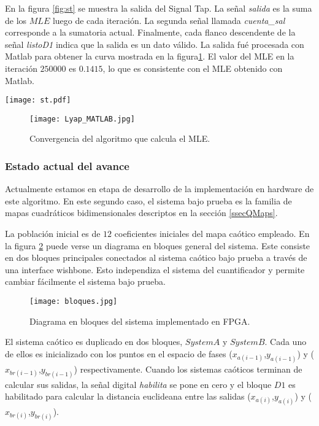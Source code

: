 En la figura \ref{fig:st} se muestra la salida del Signal Tap.
La señal \textit{salida} es la suma de los $MLE$ luego de cada iteración.
La segunda señal llamada \textit{cuenta\_sal} corresponde a la sumatoria actual.
Finalmente, cada flanco descendente de la señal \textit{listoD1} indica que la salida es un dato válido.
La salida fué procesada con Matlab para obtener la curva mostrada en la figura\ref{fig:lyapu}.
El valor del MLE en la iteración $250000$ es $0.1415$, lo que es consistente con el MLE obtenido con Matlab.
%
\begin{figure*}
	\centering
	\texttt{[image: st.pdf]}\\
	\caption{Salida del Signal Tap.}\label{fig:st}
\end{figure*}
%
\begin{figure}
	\centering
	\texttt{[image: Lyap\_MATLAB.jpg]}\\
	\caption{Convergencia del algoritmo que calcula el MLE.}\label{fig:lyapu}
\end{figure}


\subsubsection{Estado actual del avance}

Actualmente estamos en etapa de desarrollo de la implementación en hardware de este algoritmo.
En este segundo caso, el sistema bajo prueba es la familia de mapas cuadráticos bidimensionales descriptos en la sección \ref{ssecQMaps}.

La población inicial es de $12$ coeficientes iniciales del mapa caótico empleado.
En la figura \ref{bloques} puede verse un diagrama en bloques general del sistema.
Este consiste en dos bloques principales conectados al sistema caótico bajo prueba a través de una interface wishbone.
Esto independiza el sistema del cuantificador y permite cambiar fácilmente el sistema bajo prueba.
%
\begin{figure}
	\centering
	\texttt{[image: bloques.jpg]}\\
	\caption{Diagrama en bloques del sistema implementado en FPGA.}\label{bloques}
\end{figure}

El sistema caótico es duplicado en dos bloques, $System A$ y $System B$.
Cada uno de ellos es inicializado con los puntos en el espacio de fases	($x_{a(i-1)}$,$y_{a(i-1)}$) y ($x_{br(i-1)}$,$y_{br(i-1)}$) respectivamente.
Cuando los sistemas caóticos terminan de calcular sus salidas, la señal digital \textit{habilita} se pone en cero y el bloque $D1$ es habilitado para calcular la distancia euclideana entre las salidas ($x_{a(i)}$,$y_{a(i)}$) y ($x_{br(i)}$,$y_{br(i)}$).

